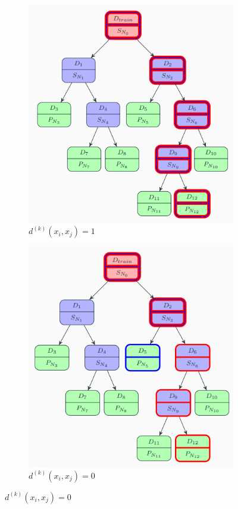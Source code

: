 \documentclass[12pt,a4paper]{report}
\begin{document}
\begin{figure}[!h]
    \centering
    \begin{subfigure}[b]{0.45\textwidth}
        \includegraphics[height=0.99\textwidth]{dissi_1.png}
        \caption{$d^{(k)}(x_i,x_j) = 1$}
    \end{subfigure}
    \begin{subfigure}[b]{0.45\textwidth}
        \includegraphics[height=0.99\textwidth]{dissi_0.png}
        \caption{$d^{(k)}(x_i,x_j) = 0$}
    \end{subfigure}
    
\end{figure}
\end{document}
